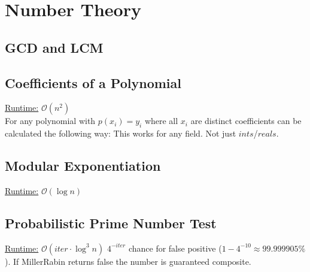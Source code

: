 \section{Number Theory}
\subsection{GCD and LCM}

\subsection{Coefficients of a Polynomial}
\underline{Runtime:} $\mathcal{O}(n^2)$ \\
For any polynomial with $p(x_i) = y_i$ where all $x_i$ are distinct
coefficients can be calculated the following way:
This works for any field. Not just $ints$/$reals$.
\subsection{Modular Exponentiation}
\underline{Runtime:} $\mathcal{O}(\log n)$

\subsection{Probabilistic Prime Number Test}
\underline{Runtime:} $\mathcal{O}(iter \cdot \log^3 n)$
$4^{-iter}$ chance for false positive ($1 - 4^{-10} \approx 99.999905\%$). If MillerRabin returns false the number is guaranteed composite.
